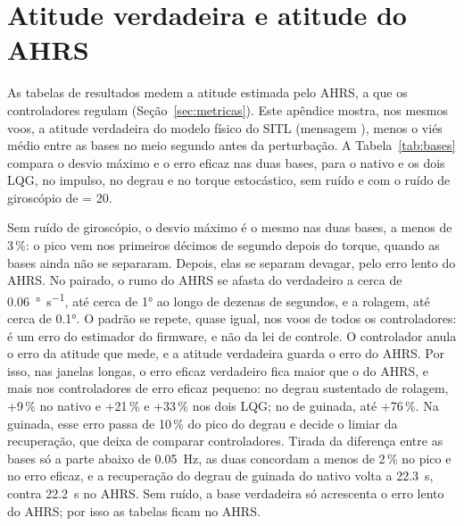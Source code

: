 \chapter{Atitude verdadeira e atitude do AHRS}
\label{ap:bases}

As tabelas de resultados medem a atitude estimada pelo AHRS, a que os
controladores regulam (Seção~\ref{sec:metricas}). Este apêndice mostra, nos
mesmos voos, a atitude verdadeira do modelo físico do SITL (mensagem
), menos o viés médio entre as bases no meio segundo antes da
perturbação. A Tabela~\ref{tab:bases} compara o desvio máximo e o erro
eficaz nas duas bases, para o nativo e os dois LQG, no impulso, no degrau e
no torque estocástico, sem ruído e com o ruído de giroscópio de
 = 20.

Sem ruído de giroscópio, o desvio máximo é o mesmo nas duas bases, a menos
de 3\,\%: o pico vem nos primeiros décimos de segundo depois do torque,
quando as bases ainda não se separaram. Depois, elas se separam devagar,
pelo erro lento do AHRS. No pairado, o rumo do AHRS se afasta do verdadeiro
a cerca de \SI{0.06}{\degree\per\second}, até cerca de \ang{1} ao longo de
dezenas de segundos, e a rolagem, até cerca de \ang{0.1}. O padrão se
repete, quase igual, nos voos de todos os controladores: é um erro do
estimador do firmware, e não da lei de controle. O controlador anula o erro
da atitude que mede, e a atitude verdadeira guarda o erro do AHRS. Por
isso, nas janelas longas, o erro eficaz verdadeiro fica maior que o do AHRS,
e mais nos controladores de erro eficaz pequeno: no degrau sustentado de
rolagem, +9\,\% no nativo e +21\,\% e +33\,\% nos dois LQG; no de guinada,
até +76\,\%. Na guinada, esse erro passa de 10\,\% do pico do degrau e
decide o limiar da recuperação, que deixa de comparar controladores. Tirada
da diferença entre as bases só a parte abaixo de \SI{0.05}{\hertz}, as duas
concordam a menos de 2\,\% no pico e no erro eficaz, e a recuperação do
degrau de guinada do nativo volta a \SI{22.3}{\second}, contra
\SI{22.2}{\second} no AHRS. Sem ruído, a base verdadeira só acrescenta o erro
lento do AHRS; por isso as tabelas ficam no AHRS.

